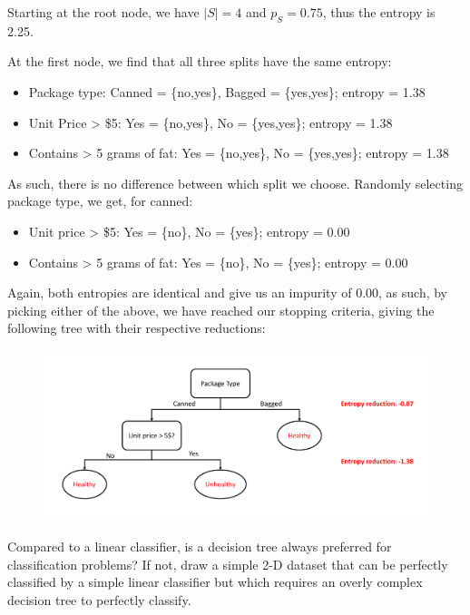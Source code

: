 \begin{solution}
 Starting at the root node, we have $|S|=4$ and $p_S = 0.75$, thus the entropy is 2.25.

 At the first node, we find that all three splits have the same entropy:
 \begin{itemize}
     \item Package type: Canned = \{no,yes\}, Bagged = \{yes,yes\}; entropy = 1.38
     \item Unit Price > \$5: Yes = \{no,yes\}, No = \{yes,yes\}; entropy = 1.38
     \item Contains > 5 grams of fat: Yes = \{no,yes\}, No = \{yes,yes\}; entropy = 1.38
 \end{itemize}
 As such, there is no difference between which split we choose. Randomly selecting package type, we get, for canned:
 \begin{itemize}
     \item Unit price > \$5: Yes = \{no\}, No = \{yes\}; entropy = 0.00
     \item Contains > 5 grams of fat: Yes = \{no\}, No = \{yes\}; entropy = 0.00
 \end{itemize}
 Again, both entropies are identical and give us an impurity of 0.00, as such, by picking either of the above, we have reached our stopping criteria, giving the following tree with their respective reductions:
 \begin{figure}[H]
    \begin{center}
    \includegraphics[width=\textwidth]{Tree_1A.pdf}
    \end{center}
    \end{figure}
\end{solution}

\problem[4]
Compared to a linear classifier, is a decision tree always preferred for classification problems? If not, draw a simple 2-D dataset that can be perfectly classified by a simple linear classifier but which requires an overly complex decision tree to perfectly classify.

